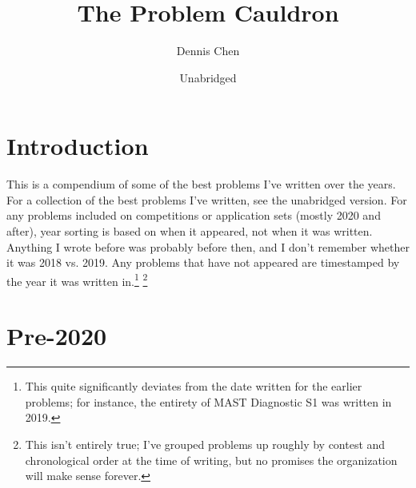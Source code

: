 \documentclass{article}
\title{The Problem Cauldron}
\author{Dennis Chen}
\date{Unabridged}
\begin{document}
\maketitle

\section{Introduction}

This is a compendium of some of the best problems I've written over the years. For a collection of the best problems I've written, see the unabridged version. For any problems included on competitions or application sets (mostly 2020 and after), year sorting is based on when it appeared, not when it was written. Anything I wrote before was probably before then, and I don't remember whether it was 2018 vs. 2019. Any problems that have not appeared are timestamped by the year it was written in.\footnote{This quite significantly deviates from the date written for the earlier problems; for instance, the entirety of MAST Diagnostic S1 was written in 2019.} \footnote{This isn't entirely true; I've grouped problems up roughly by contest and chronological order at the time of writing, but no promises the organization will make sense forever.}

\pagebreak

\section{Pre-2020}
\end{document}

